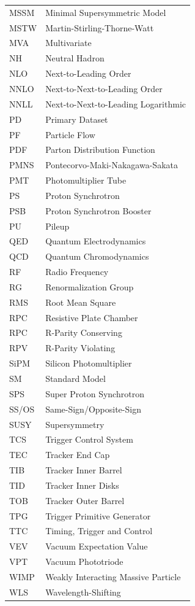 \documentclass[12pt]{thesis}  %
\begin{document}
\begin{longtable}[l]{@{}l@{\ \ \ \ \ \ \ \ \ \ \ \ }l}
MSSM       & Minimal Supersymmetric Model \\
MSTW       & Martin-Stirling-Thorne-Watt \\
MVA        & Multivariate \\
NH         & Neutral Hadron \\
NLO        & Next-to-Leading Order \\
NNLO       & Next-to-Next-to-Leading Order \\
NNLL       & Next-to-Next-to-Leading Logarithmic \\
PD         & Primary Dataset \\
PF         & Particle Flow \\
PDF        & Parton Distribution Function \\
PMNS       & Pontecorvo-Maki-Nakagawa-Sakata \\
PMT        & Photomultiplier Tube \\
PS         & Proton Synchrotron \\
PSB        & Proton Synchrotron Booster \\
PU         & Pileup \\
QED        & Quantum Electrodynamics \\
QCD        & Quantum Chromodynamics \\
RF         & Radio Frequency \\
RG         & Renormalization Group \\
RMS        & Root Mean Square \\
RPC        & Resistive Plate Chamber \\
RPC        & R-Parity Conserving \\
RPV        & R-Parity Violating \\
SiPM       & Silicon Photomultiplier \\
SM         & Standard Model \\
SPS        & Super Proton Synchrotron \\
SS/OS      & Same-Sign/Opposite-Sign \\
SUSY       & Supersymmetry \\
TCS        & Trigger Control System \\
TEC        & Tracker End Cap \\
TIB        & Tracker Inner Barrel \\
TID        & Tracker Inner Disks \\
TOB        & Tracker Outer Barrel \\
TPG        & Trigger Primitive Generator \\
TTC        & Timing, Trigger and Control \\
VEV        & Vacuum Expectation Value \\
VPT        & Vacuum Phototriode \\
WIMP       & Weakly Interacting Massive Particle \\
WLS        & Wavelength-Shifting \\
\end{longtable}
\end{document}
